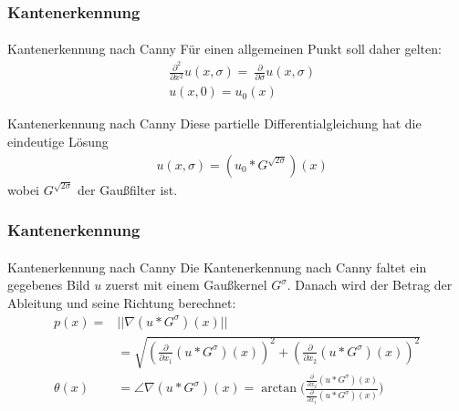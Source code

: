 \documentclass{beamer}
\begin{document}
\begin{frame}
    \frametitle{Kantenerkennung}
\framesubtitle{}

\begin{block}{Kantenerkennung nach Canny}
Für einen allgemeinen Punkt soll daher gelten:
\begin{align*}
&\frac{\partial^2}{\partial x^2}  u(x, \sigma)  =  \ \frac{\partial}{\partial \sigma}  u(x, \sigma)  \\
&  u(x, 0) = u_0(x) 
\end{align*}
 \end{block}

\begin{block}{Kantenerkennung nach Canny}
Diese partielle Differentialgleichung hat die eindeutige Lösung
\begin{align*}
&  u(x, \sigma) = (u_0 * G^{\sqrt{2\sigma}}) (x)
\end{align*}
wobei $ G^{\sqrt{2\sigma}}$ der Gaußfilter ist.
 \end{block}

 \end{frame}


\begin{frame}
    \frametitle{Kantenerkennung}
\framesubtitle{}

\begin{block}{Kantenerkennung nach Canny}
Die Kantenerkennung nach Canny faltet ein gegebenes Bild $u$ zuerst mit einem Gaußkernel $G^{\sigma}$. Danach wird  der Betrag der Ableitung und seine Richtung berechnet: 
\begin{align*}
p(x) = & || \nabla (u * G^\sigma)(x) || \\
&= \sqrt{ (\frac{\partial}{\partial x_1} (u * G^\sigma)(x))^2 + (\frac{\partial}{\partial x_2} (u * G^\sigma)(x))^2 } \\
\theta(x) & = \angle  \nabla (u * G^\sigma)(x) = \arctan \biggl( \frac{\frac{\partial}{\partial x_2} (u * G^\sigma)(x)}{\frac{\partial}{\partial x_1} (u * G^\sigma)(x)} \biggr)
\end{align*}


 \end{block}

 \end{frame}
\end{document}
